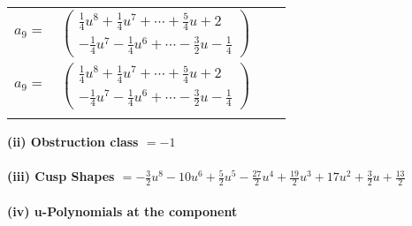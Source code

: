 \documentclass[1p]{elsarticle_modified}
\theoremstyle{definition}
\begin{document}
\begin{tabular}{m{7pt} m{180pt} m{7pt} m{180pt} }
\flushright $a_{9}=$&$\begin{pmatrix}\frac{1}{4} u^8+\frac{1}{4} u^7+\cdots+\frac{5}{4} u+2\\-\frac{1}{4} u^7-\frac{1}{4} u^6+\cdots-\frac{3}{2} u-\frac{1}{4}\end{pmatrix}$\\ \flushright $a_{9}=$&$\begin{pmatrix}\frac{1}{4} u^8+\frac{1}{4} u^7+\cdots+\frac{5}{4} u+2\\-\frac{1}{4} u^7-\frac{1}{4} u^6+\cdots-\frac{3}{2} u-\frac{1}{4}\end{pmatrix}$\\&\end{tabular}
\flushleft \textbf{(ii) Obstruction class $= -1$}\\~\\
\flushleft \textbf{(iii) Cusp Shapes $= -\frac{3}{2} u^8-10 u^6+\frac{5}{2} u^5-\frac{27}{2} u^4+\frac{19}{2} u^3+17 u^2+\frac{3}{2} u+\frac{13}{2}$}\\~\\
\newpage\renewcommand{\arraystretch}{1}
\flushleft \textbf{(iv) u-Polynomials at the component}\newline \\
\end{document}
